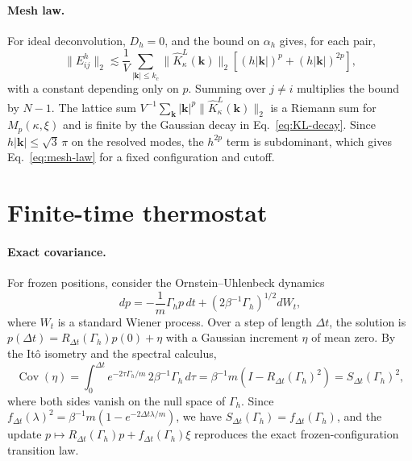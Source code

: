 \documentclass[11pt]{article}
\theoremstyle{plain}
\newcommand{\kk}{\bm k}
\DeclareRobustCommand{\_}{\textunderscore\allowbreak}
\begin{document}
\paragraph{Mesh law.}
For ideal deconvolution, $D_h=0$, and the bound on $\alpha_h$ gives, for
each pair,
\begin{equation}
\|E^h_{ij}\|_2
\lesssim
\frac1V\sum_{|\kk|\le k_c}
\|\widehat K_\kappa^L(\kk)\|_2
\left[(h|\kk|)^p+(h|\kk|)^{2p}\right],
\end{equation}
with a constant depending only on $p$. Summing over $j\ne i$ multiplies the
bound by $N-1$. The lattice sum
$V^{-1}\sum_{\kk}|\kk|^p\|\widehat K_\kappa^L(\kk)\|_2$ is a Riemann sum
for $M_p(\kappa,\xi)$ and is finite by the Gaussian decay in
Eq.~\eqref{eq:KL-decay}. Since $h|\kk|\le\sqrt3\,\pi$ on the resolved
modes, the $h^{2p}$ term is subdominant, which gives Eq.~\eqref{eq:mesh-law} for a fixed
configuration and cutoff.

\section{Finite-time thermostat}
\label{app:thermostat}

\paragraph{Exact covariance.}
For frozen positions, consider the Ornstein--Uhlenbeck dynamics
\begin{equation}
dp
=
-\frac1m\Gamma_h p\,dt
+
\left(2\beta^{-1}\Gamma_h\right)^{1/2}dW_t,
\end{equation}
where $W_t$ is a standard Wiener process. Over a step of length $\Delta t$,
the solution is $p(\Delta t)=R_{\Delta t}(\Gamma_h)p(0)+\eta$ with a
Gaussian increment $\eta$ of mean zero. By the It\^o isometry and the
spectral calculus,
\begin{equation}
\operatorname{Cov}(\eta)
=
\int_0^{\Delta t}
e^{-2\tau\Gamma_h/m}\,2\beta^{-1}\Gamma_h\,d\tau
=
\beta^{-1}m\left(I-R_{\Delta t}(\Gamma_h)^2\right)
=
S_{\Delta t}(\Gamma_h)^2 ,
\end{equation}
where both sides vanish on the null space of $\Gamma_h$. Since
$f_{\Delta t}(\lambda)^2=\beta^{-1}m(1-e^{-2\Delta t\lambda/m})$, we have
$S_{\Delta t}(\Gamma_h)=f_{\Delta t}(\Gamma_h)$, and the update
$p\mapsto R_{\Delta t}(\Gamma_h)p+f_{\Delta t}(\Gamma_h)\xi$ reproduces
the exact frozen-configuration transition law.
\end{document}
